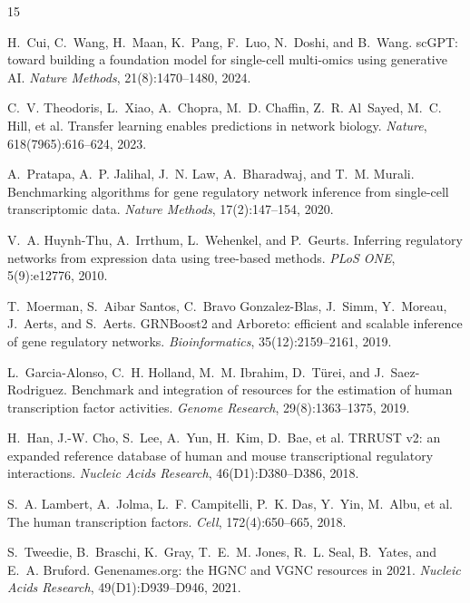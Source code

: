 \documentclass[sigconf]{acmart}
\begin{document}
\begin{thebibliography}{15}

H.~Cui, C.~Wang, H.~Maan, K.~Pang, F.~Luo, N.~Doshi, and B.~Wang.
sc{GPT}: toward building a foundation model for single-cell multi-omics
using generative {AI}.
\emph{Nature Methods}, 21(8):1470--1480, 2024.

C.~V. Theodoris, L.~Xiao, A.~Chopra, M.~D. Chaffin, Z.~R. Al~Sayed, M.~C. Hill, et al.
Transfer learning enables predictions in network biology.
\emph{Nature}, 618(7965):616--624, 2023.

A.~Pratapa, A.~P. Jalihal, J.~N. Law, A.~Bharadwaj, and T.~M. Murali.
Benchmarking algorithms for gene regulatory network inference from
single-cell transcriptomic data.
\emph{Nature Methods}, 17(2):147--154, 2020.

V.~A. Huynh-Thu, A.~Irrthum, L.~Wehenkel, and P.~Geurts.
Inferring regulatory networks from expression data using tree-based
methods. \emph{PLoS ONE}, 5(9):e12776, 2010.

T.~Moerman, S.~Aibar Santos, C.~Bravo Gonzalez-Blas, J.~Simm, Y.~Moreau, J.~Aerts, and S.~Aerts.
GRNBoost2 and Arboreto: efficient and scalable inference of gene
regulatory networks. \emph{Bioinformatics}, 35(12):2159--2161, 2019.

L.~Garcia-Alonso, C.~H. Holland, M.~M. Ibrahim, D.~T\"urei, and J.~Saez-Rodriguez.
Benchmark and integration of resources for the estimation of human
transcription factor activities.
\emph{Genome Research}, 29(8):1363--1375, 2019.

H.~Han, J.-W. Cho, S.~Lee, A.~Yun, H.~Kim, D.~Bae, et al.
TRRUST v2: an expanded reference database of human and mouse
transcriptional regulatory interactions.
\emph{Nucleic Acids Research}, 46(D1):D380--D386, 2018.

S.~A. Lambert, A.~Jolma, L.~F. Campitelli, P.~K. Das, Y.~Yin, M.~Albu, et al.
The human transcription factors.
\emph{Cell}, 172(4):650--665, 2018.

S.~Tweedie, B.~Braschi, K.~Gray, T.~E.~M. Jones, R.~L. Seal, B.~Yates, and E.~A. Bruford.
Genenames.org: the HGNC and VGNC resources in 2021.
\emph{Nucleic Acids Research}, 49(D1):D939--D946, 2021.


\end{thebibliography}
\end{document}

